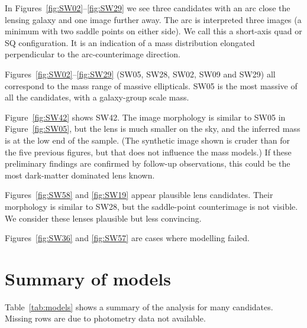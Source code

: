 \documentclass[fleqn,usenatbib]{mnras}
\newcommand{\figref}[1]{\ref{fig:#1}}
\begin{document}
In Figures~\figref{SW02}--\figref{SW29} we see three candidates with
an arc close the lensing galaxy and one image further away.  The arc
is interpreted three images (a minimum with two saddle points on
either side).  We call this a short-axis quad or SQ configuration.  It
is an indication of a mass distribution elongated perpendicular to the
arc-counterimage direction.

Figures~\figref{SW02}--\figref{SW29} (SW05, SW28, SW02, SW09 and SW29)
all correspond to the mass range of massive ellipticals.  SW05 is the
most massive of all the candidates, with a galaxy-group scale mass.

Figure~\figref{SW42} shows SW42.  The image morphology is similar to
SW05 in Figure~\figref{SW05}, but the lens is much smaller on the sky,
and the inferred mass is at the low end of the sample.  (The synthetic
image shown is cruder than for the five previous figures, but that
does not influence the mass models.)  If these preliminary findings
are confirmed by follow-up observations, this could be the most
dark-matter dominated lens known.

Figures~\figref{SW58} and \figref{SW19} appear plausible lens
candidates.  Their morphology is similar to SW28, but the saddle-point
counterimage is not visible.  We consider these lenses plausible but
less convincing.

Figures~\figref{SW36} and \figref{SW57} are cases where modelling
failed.


\section{Summary of models}\label{sec:summary}

Table~\ref{tab:models} shows a summary of the analysis for many candidates.
Missing rows are due to photometry data not available.
\end{document}
